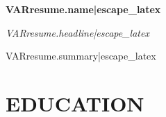 \documentclass[10pt,letterpaper]{article}
\newcommand{\headervspace}{\vspace{-10pt}}
\newcommand{\contactvspace}{\vspace{1pt}}
\newcommand{\headervspace}{\vspace{-8pt}}
\newcommand{\contactvspace}{\vspace{2pt}}
\newcommand{\headervspace}{\vspace{2pt}}
\newcommand{\contactvspace}{\vspace{9pt}}
\newcommand{\headervspace}{\vspace{-5pt}}
\newcommand{\contactvspace}{\vspace{5pt}}
\newcommand{\resumeHeader}[1]{
  \begin{center}
    {\huge\bfseries #1}
  \end{center}
  \headervspace
}
\newcommand{\resumeContact}[1]{
  \begin{center}
    #1
  \end{center}
  \contactvspace
}
\begin{document}
\fontsize{9.3}{11.3}\selectfont

\resumeHeader{VAR{resume.name|escape_latex}}
\vspace{-10pt}
\resumeContact{
}

\begin{center}
  \textit{VAR{resume.headline|escape_latex}}
\end{center}
\vspace{5pt}

\noindent
VAR{resume.summary|escape_latex}
\vspace{10pt}

\section*{EDUCATION}


\end{document}
